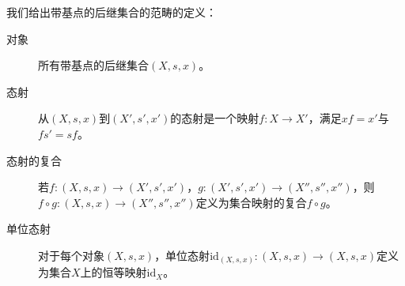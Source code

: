 \documentclass[oneside, 12pt]{ctexart}
\begin{document}
我们给出带基点的后继集合的范畴的定义：

\begin{description}
	\item[对象] 所有带基点的后继集合$(X, s, x)$。
	\item[态射] 从$(X, s, x)$到$(X', s', x')$的态射是一个映射$f \colon X \to X'$，满足$xf = x'$与$fs' = sf$。
	\item[态射的复合] 若$f \colon (X, s, x) \to (X', s', x')$，$g \colon (X', s', x') \to (X'', s'', x'')$，则$f \circ g \colon (X, s, x) \to (X'', s'', x'')$定义为集合映射的复合$f \circ g$。
	\item[单位态射] 对于每个对象$(X, s, x)$，单位态射$\text{id}_{(X, s, x)} \colon (X, s, x) \to (X, s, x)$定义为集合$X$上的恒等映射$\text{id}_X$。
\end{description}
\end{document}
